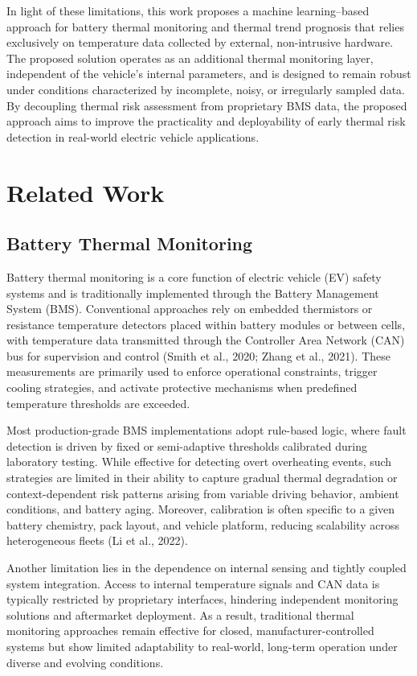 \documentclass[conference]{IEEEtran}
\begin{document}
In light of these limitations, this work proposes a machine learning–based approach for battery thermal monitoring and thermal trend prognosis that relies exclusively on temperature data collected by external, non-intrusive hardware. The proposed solution operates as an additional thermal monitoring layer, independent of the vehicle’s internal parameters, and is designed to remain robust under conditions characterized by incomplete, noisy, or irregularly sampled data. By decoupling thermal risk assessment from proprietary BMS data, the proposed approach aims to improve the practicality and deployability of early thermal risk detection in real-world electric vehicle applications.

\section{Related Work}

\subsection{Battery Thermal Monitoring}

Battery thermal monitoring is a core function of electric vehicle (EV) safety systems and is traditionally implemented through the Battery Management System (BMS). Conventional approaches rely on embedded thermistors or resistance temperature detectors placed within battery modules or between cells, with temperature data transmitted through the Controller Area Network (CAN) bus for supervision and control (Smith et al., 2020; Zhang et al., 2021). These measurements are primarily used to enforce operational constraints, trigger cooling strategies, and activate protective mechanisms when predefined temperature thresholds are exceeded.

Most production-grade BMS implementations adopt rule-based logic, where fault detection is driven by fixed or semi-adaptive thresholds calibrated during laboratory testing. While effective for detecting overt overheating events, such strategies are limited in their ability to capture gradual thermal degradation or context-dependent risk patterns arising from variable driving behavior, ambient conditions, and battery aging. Moreover, calibration is often specific to a given battery chemistry, pack layout, and vehicle platform, reducing scalability across heterogeneous fleets (Li et al., 2022).

Another limitation lies in the dependence on internal sensing and tightly coupled system integration. Access to internal temperature signals and CAN data is typically restricted by proprietary interfaces, hindering independent monitoring solutions and aftermarket deployment. As a result, traditional thermal monitoring approaches remain effective for closed, manufacturer-controlled systems but show limited adaptability to real-world, long-term operation under diverse and evolving conditions.
\end{document}
